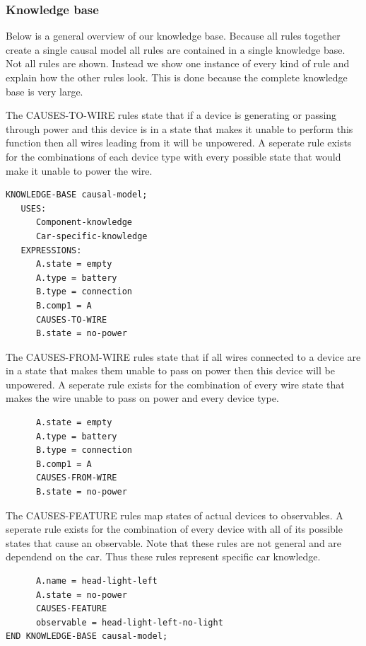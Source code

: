 \documentclass[a4paper,10pt]{article}
\begin{document}
\subsubsection{Knowledge base}
Below is a general overview of our knowledge base. Because all rules together create a single causal model all rules are contained in a single knowledge base. Not all rules are shown. Instead we show one instance of every kind of rule and explain how the other rules look. This is done because the complete knowledge base is very large.

The CAUSES-TO-WIRE rules state that if a device is generating or passing through power and this device is in a state that makes it unable to perform this function then all wires leading from it will be unpowered. A seperate rule exists for the combinations of each device type with every possible state that would make it unable to power the wire.

\begin{verbatim}
KNOWLEDGE-BASE causal-model;
   USES:
      Component-knowledge
      Car-specific-knowledge
   EXPRESSIONS:
      A.state = empty
      A.type = battery
      B.type = connection
      B.comp1 = A
      CAUSES-TO-WIRE
      B.state = no-power
\end{verbatim}

The CAUSES-FROM-WIRE rules state that if all wires connected to a device are in a state that makes them unable to pass on power then this device will be unpowered. A seperate rule exists for the combination of every wire state that makes the wire unable to pass on power and every device type.

\begin{verbatim}
      A.state = empty
      A.type = battery
      B.type = connection
      B.comp1 = A
      CAUSES-FROM-WIRE
      B.state = no-power
\end{verbatim}

The CAUSES-FEATURE rules map states of actual devices to observables. A seperate rule exists for the combination of every device with all of its possible states that cause an observable. Note that these rules are not general and are dependend on the car. Thus these rules represent specific car knowledge.

\begin{verbatim}
      A.name = head-light-left
      A.state = no-power
      CAUSES-FEATURE
      observable = head-light-left-no-light
END KNOWLEDGE-BASE causal-model;
\end{verbatim}
\end{document}
